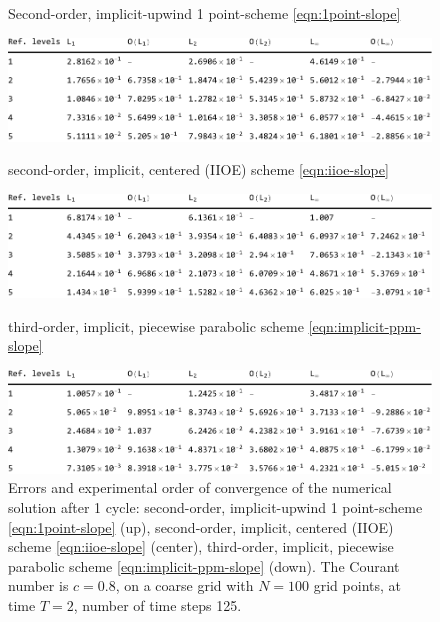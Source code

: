 \documentclass[../thesis.tex]{subfiles}
\begin{document}
\begin{figure}[H]
	\centering
    \caption*{Second-order, implicit-upwind 1 point-scheme \eqref{eqn:1point-slope}}
	\includegraphics[width=\textwidth]{../tab/tab-1point-c0p8-T2-limit0-shu.pdf}
    \caption*{second-order, implicit, centered (IIOE) scheme \eqref{eqn:iioe-slope}}
	\includegraphics[width=\textwidth]{../tab/tab-iioe-c0p8-T2-limit0-shu.pdf}
    \caption*{third-order, implicit, piecewise parabolic scheme \eqref{eqn:implicit-ppm-slope}}
	\includegraphics[width=\textwidth]{../tab/tab-implicit-ppm-c0p8-T2-limit0-shu.pdf}
	\caption{Errors and experimental order of convergence of the numerical solution after 1 cycle: second-order, implicit-upwind 1 point-scheme \eqref{eqn:1point-slope} (up), second-order, implicit, centered (IIOE) scheme \eqref{eqn:iioe-slope} (center), third-order, implicit, piecewise parabolic scheme \eqref{eqn:implicit-ppm-slope} (down). The Courant number is \(c = 0.8\), on a coarse grid with \(N = 100\) grid points, at time \(T = 2\), number of time steps 125.}
	\label{tab:c0p8-T2-limit0-shu}
\end{figure}
\end{document}
